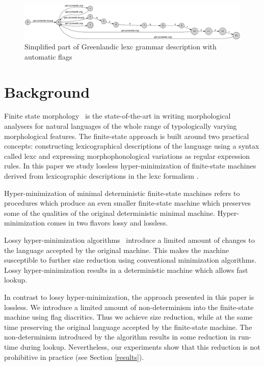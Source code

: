 \documentclass[11pt]{article}
\begin{document}
\begin{figure}[!htb]
    \includegraphics[width=\textwidth]{gr.png}
     \caption{Simplified part of Greenlandic lexc grammar description with automatic flags
     \label{fig:lexc-gr-flag}}
\end{figure}

\section{Background}
\label{sec:background}

Finite state morphology~\cite{beesley2003finite} is the
state-of-the-art in writing morphological analysers for natural
languages of the whole range of typologically varying morphological
features. The finite-state approach is built around two practical
concepts: constructing lexicographical descriptions of the language
using a syntax called lexc and expressing morphophonological
variations as regular expression rules. In this paper we study lossless
hyper-minimization of finite-state machines derived from lexicographic
descriptions in the lexc formalism \cite{beesley1998constraining}.

Hyper-minimization of minimal deterministic finite-state machines
refers to procedures which produce an even smaller finite-state
machine which preserves some of the qualities of the original
deterministic minimal machine. Hyper-minimization comes in two flavors
lossy and lossless.

Lossy hyper-minimization algorithms~\cite{maletti2011} introduce a
limited amount of changes to the language accepted by the original
machine. This makes the machine susceptible to further size reduction
using conventional minimization algorithms. Lossy hyper-minimization results in a deterministic machine which allows fast lookup.

In contrast to lossy hyper-minimization, the approach presented in
this paper is lossless. We introduce a limited amount of
non-determinism into the finite-state machine using flag
diacritics. Thus we achieve size reduction, while at the same time
preserving the original language accepted by the finite-state
machine. The non-determinism introduced by the algorithm results in
some reduction in run-time during lookup. Nevertheless, our
experiments show that this reduction is not prohibitive in practice
(see Section \ref{results}).
\end{document}
